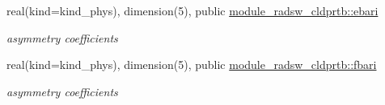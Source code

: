 \begin{Indent}
\begin{DoxyCompactItemize}
\mbox{\label{namespacemodule__radsw__cldprtb_a3cc7ab844ca564bd3df02a687bbc2f43}} 
real(kind=kind\+\_\+phys), dimension(5), public \hyperlink{namespacemodule__radsw__cldprtb_a3cc7ab844ca564bd3df02a687bbc2f43}{module\+\_\+radsw\+\_\+cldprtb\+::ebari}
\begin{DoxyCompactList}\small\item\em asymmetry coefficients \end{DoxyCompactList}\item 
\mbox{\label{namespacemodule__radsw__cldprtb_ac2e5b61aea6effe7d49586bf5223c154}} 
real(kind=kind\+\_\+phys), dimension(5), public \hyperlink{namespacemodule__radsw__cldprtb_ac2e5b61aea6effe7d49586bf5223c154}{module\+\_\+radsw\+\_\+cldprtb\+::fbari}
\begin{DoxyCompactList}\small\item\em asymmetry coefficients \end{DoxyCompactList}\end{DoxyCompactItemize}
\end{Indent}
